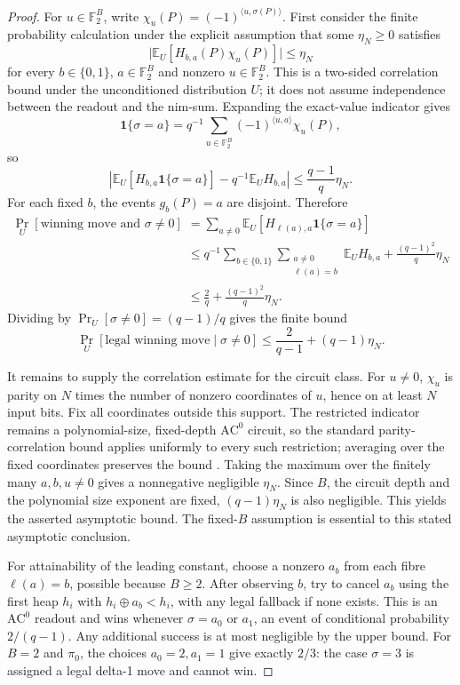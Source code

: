 \documentclass[twoside,11pt]{article}
\newcommand{\AC}{\mathrm{AC}}
\numberwithin{theorem}{section}
\numberwithin{equation}{section}
\begin{document}
\begin{proof}
For $u\in\mathbb F_2^B$, write $\chi_u(P)=(-1)^{\langle u,\sigma(P)\rangle}$. First consider the finite probability calculation under the explicit assumption that some $\eta_N\ge0$ satisfies
\[
\bigl|\mathbb E_U[H_{b,a}(P)\chi_u(P)]\bigr|
\le \eta_N
\]
for every $b\in\{0,1\}$, $a\in\mathbb F_2^B$ and nonzero $u\in\mathbb F_2^B$. This is a two-sided correlation bound under the unconditioned distribution $U$; it does not assume independence between the readout and the nim-sum.
Expanding the exact-value indicator gives
\[
\mathbf1\{\sigma=a\}=q^{-1}\sum_{u\in\mathbb F_2^B}
(-1)^{\langle u,a\rangle}\chi_u(P),
\]
so
\[
\left|\mathbb E_U[H_{b,a}\mathbf1\{\sigma=a\}]
-q^{-1}\mathbb E_U H_{b,a}\right|
\le \frac{q-1}{q}\eta_N.
\]
For each fixed $b$, the events $g_b(P)=a$ are disjoint. Therefore
\begin{align*}
\Pr_U[\text{winning move and }\sigma\ne0]
&=\sum_{a\ne0}\mathbb E_U[H_{\ell(a),a}\mathbf1\{\sigma=a\}]\\
&\le q^{-1}\sum_{b\in\{0,1\}}\sum_{\substack{a\ne0\\\ell(a)=b}}
\mathbb E_U H_{b,a}+\frac{(q-1)^2}{q}\eta_N\\
&\le \frac{2}{q}+\frac{(q-1)^2}{q}\eta_N.
\end{align*}
Dividing by $\Pr_U[\sigma\ne0]=(q-1)/q$ gives the finite bound
\begin{equation}
\Pr_U[\text{legal winning move}\mid\sigma\ne0]
\le \frac{2}{q-1}+(q-1)\eta_N.
\label{eq:finite-correlation-bound}
\end{equation}

It remains to supply the correlation estimate for the circuit class. For $u\ne0$, $\chi_u$ is parity on $N$ times the number of nonzero coordinates of $u$, hence on at least $N$ input bits. Fix all coordinates outside this support. The restricted indicator remains a polynomial-size, fixed-depth $\AC^0$ circuit, so the standard parity-correlation bound applies uniformly to every such restriction; averaging over the fixed coordinates preserves the bound \citep{hastad1986thesis,hastad2014correlation}. Taking the maximum over the finitely many $a,b,u\ne0$ gives a nonnegative negligible $\eta_N$. Since $B$, the circuit depth and the polynomial size exponent are fixed, $(q-1)\eta_N$ is also negligible. This yields the asserted asymptotic bound. The fixed-$B$ assumption is essential to this stated asymptotic conclusion.

For attainability of the leading constant, choose a nonzero $a_b$ from each fibre $\ell(a)=b$, possible because $B\ge2$. After observing $b$, try to cancel $a_b$ using the first heap $h_i$ with $h_i\oplus a_b<h_i$, with any legal fallback if none exists. This is an $\AC^0$ readout and wins whenever $\sigma=a_0$ or $a_1$, an event of conditional probability $2/(q-1)$. Any additional success is at most negligible by the upper bound. For $B=2$ and $\pi_0$, the choices $a_0=2,a_1=1$ give exactly $2/3$: the case $\sigma=3$ is assigned a legal delta-1 move and cannot win.


\end{proof}
\end{document}
